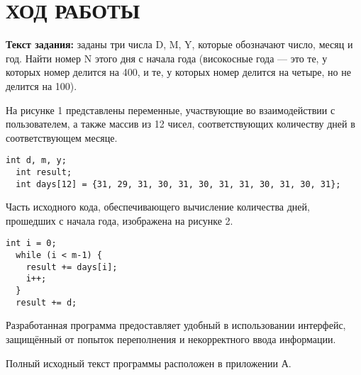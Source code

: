 
\section{ХОД РАБОТЫ}

\textbf{Текст задания:} заданы три числа D, M, Y, которые обозначают число, месяц и год. Найти номер N этого дня с начала года (високосные года --- это те, у которых номер делится на 400, и те, у которых номер делится на четыре, но не делится на 100).

На рисунке 1 представлены переменные, участвующие во взаимодействии с пользователем, а также массив из 12 чисел, соответствующих количеству дней в соответствующем месяце.

\begin{lstlisting}[caption=Объявление переменных и объявление и инициализация массива]
  int d, m, y;
  int result;
  int days[12] = {31, 29, 31, 30, 31, 30, 31, 31, 30, 31, 30, 31};  
\end{lstlisting}

Часть исходного кода, обеспечивающего вычисление количества дней, прошедших с начала года, изображена на рисунке 2.

\begin{lstlisting}[caption=Вычисление количества дней]
  int i = 0;
  while (i < m-1) {
    result += days[i];
    i++;
  }
  result += d;
\end{lstlisting}

Разработанная программа предоставляет удобный в использовании интерфейс, защищённый от попыток переполнения и некорректного ввода информации.

Полный исходный текст программы расположен в приложении А.

\newpage